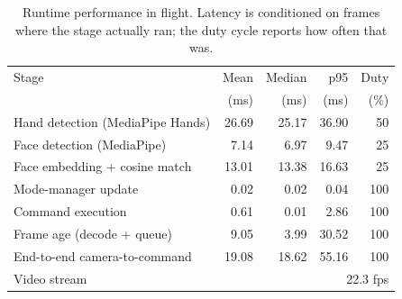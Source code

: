 \begin{table}[t]
\caption{Runtime performance in flight. Latency is conditioned on frames where the stage actually ran; the duty cycle reports how often that was.}
\label{tab:runtime}
\centering
\footnotesize
\setlength{\tabcolsep}{4pt}
\renewcommand{\arraystretch}{1.02}
\begin{tabular}{@{}lrrrr@{}}
\toprule
Stage & Mean & Median & p95 & Duty \\
& (ms) & (ms) & (ms) & (\%) \\
\midrule
Hand detection (MediaPipe Hands) & 26.69 & 25.17 & 36.90 & 50 \\
Face detection (MediaPipe) & 7.14 & 6.97 & 9.47 & 25 \\
Face embedding + cosine match & 13.01 & 13.38 & 16.63 & 25 \\
Mode-manager update & 0.02 & 0.02 & 0.04 & 100 \\
Command execution & 0.61 & 0.01 & 2.86 & 100 \\
Frame age (decode + queue) & 9.05 & 3.99 & 30.52 & 100 \\
End-to-end camera-to-command & 19.08 & 18.62 & 55.16 & 100 \\
\midrule
Video stream & \multicolumn{4}{r}{22.3 fps} \\
\bottomrule
\end{tabular}
\end{table}
